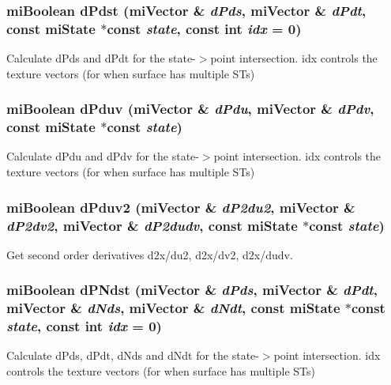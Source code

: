 \subsubsection{\setlength{\rightskip}{0pt plus 5cm}mi\-Boolean d\-Pdst (mi\-Vector \& {\em d\-Pds}, mi\-Vector \& {\em d\-Pdt}, const mi\-State $\ast$const {\em state}, const int {\em idx} = 0)\hspace{0.3cm}{\tt  [static]}}\label{namespacemr_a47}


Calculate d\-Pds and d\-Pdt for the state-$>$point intersection. idx controls the texture vectors (for when surface has multiple STs) 
\subsubsection{\setlength{\rightskip}{0pt plus 5cm}mi\-Boolean d\-Pduv (mi\-Vector \& {\em d\-Pdu}, mi\-Vector \& {\em d\-Pdv}, const mi\-State $\ast$const {\em state})\hspace{0.3cm}{\tt  [static]}}\label{namespacemr_a50}


Calculate d\-Pdu and d\-Pdv for the state-$>$point intersection. idx controls the texture vectors (for when surface has multiple STs) 
\subsubsection{\setlength{\rightskip}{0pt plus 5cm}mi\-Boolean d\-Pduv2 (mi\-Vector \& {\em d\-P2du2}, mi\-Vector \& {\em d\-P2dv2}, mi\-Vector \& {\em d\-P2dudv}, const mi\-State $\ast$const {\em state})\hspace{0.3cm}{\tt  [static]}}\label{namespacemr_a52}


Get second order derivatives d2x/du2, d2x/dv2, d2x/dudv. 

\subsubsection{\setlength{\rightskip}{0pt plus 5cm}mi\-Boolean d\-PNdst (mi\-Vector \& {\em d\-Pds}, mi\-Vector \& {\em d\-Pdt}, mi\-Vector \& {\em d\-Nds}, mi\-Vector \& {\em d\-Ndt}, const mi\-State $\ast$const {\em state}, const int {\em idx} = 0)\hspace{0.3cm}{\tt  [static]}}\label{namespacemr_a49}


Calculate d\-Pds, d\-Pdt, d\-Nds and d\-Ndt for the state-$>$point intersection. idx controls the texture vectors (for when surface has multiple STs) 
